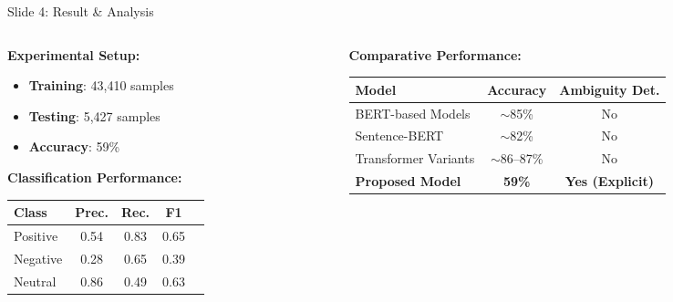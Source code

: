 \documentclass[aspectratio=169]{beamer}
\begin{document}
\begin{frame}[t,label=slide4]{Slide 4: Result \& Analysis}
\vspace{0.05cm}
\begin{columns}[T]
\begin{column}{0.38\textwidth}
\vspace{0.05cm}
\scriptsize
\textbf{Experimental Setup:}
\begin{itemize}
    \item \textbf{Training}: 43,410 samples
    \item \textbf{Testing}: 5,427 samples
    \item \textbf{Accuracy}: 59\%
\end{itemize}

\vspace{0.1cm}
\textbf{Classification Performance:}
\renewcommand{\arraystretch}{1.0}
\centering
\begin{tabular}{lcccc}
\toprule
\textbf{Class} & \textbf{Prec.} & \textbf{Rec.} & \textbf{F1} \\
\midrule
Positive & 0.54 & 0.83 & 0.65 \\
Negative & 0.28 & 0.65 & 0.39 \\
Neutral & 0.86 & 0.49 & 0.63 \\
\bottomrule
\end{tabular}
\end{column}

\begin{column}{0.60\textwidth}
\vspace{0.2cm}
\scriptsize
\centering
\textbf{Comparative Performance:}
\renewcommand{\arraystretch}{1.2}
\setlength{\tabcolsep}{4pt}
\begin{tabular}{|l|c|c|}
\hline
\textbf{Model} & \textbf{Accuracy} & \textbf{Ambiguity Det.} \\ \hline
BERT-based Models & $\sim$85\% & No \\ \hline
Sentence-BERT & $\sim$82\% & No \\ \hline
Transformer Variants & $\sim$86--87\% & No \\ \hline
\textbf{Proposed Model} & \textbf{59\%} & \textbf{Yes (Explicit)} \\ \hline
\end{tabular}
\end{column}
\end{columns}

\vfill


\end{frame}
\end{document}

